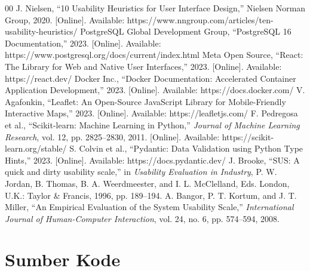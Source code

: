 \documentclass[conference]{IEEEtran}
\begin{document}
\begin{thebibliography}{00}
 J. Nielsen, ``10 Usability Heuristics for User Interface Design,'' Nielsen Norman Group, 2020. [Online]. Available: https://www.nngroup.com/articles/ten-usability-heuristics/
 PostgreSQL Global Development Group, ``PostgreSQL 16 Documentation,'' 2023. [Online]. Available: https://www.postgresql.org/docs/current/index.html
 Meta Open Source, ``React: The Library for Web and Native User Interfaces,'' 2023. [Online]. Available: https://react.dev/
 Docker Inc., ``Docker Documentation: Accelerated Container Application Development,'' 2023. [Online]. Available: https://docs.docker.com/
 V. Agafonkin, ``Leaflet: An Open-Source JavaScript Library for Mobile-Friendly Interactive Maps,'' 2023. [Online]. Available: https://leafletjs.com/
 F. Pedregosa et al., ``Scikit-learn: Machine Learning in Python,'' \textit{Journal of Machine Learning Research}, vol. 12, pp. 2825--2830, 2011. [Online]. Available: https://scikit-learn.org/stable/
 S. Colvin et al., ``Pydantic: Data Validation using Python Type Hints,'' 2023. [Online]. Available: https://docs.pydantic.dev/
 J. Brooke, ``SUS: A quick and dirty usability scale,'' in \textit{Usability Evaluation in Industry}, P. W. Jordan, B. Thomas, B. A. Weerdmeester, and I. L. McClelland, Eds. London, U.K.: Taylor \& Francis, 1996, pp. 189--194.
 A. Bangor, P. T. Kortum, and J. T. Miller, ``An Empirical Evaluation of the System Usability Scale,'' \textit{International Journal of Human-Computer Interaction}, vol. 24, no. 6, pp. 574--594, 2008.
\end{thebibliography}

\clearpage
\onecolumn

\section{Sumber Kode}
\label{sec:sumber_kode}
\end{document}
